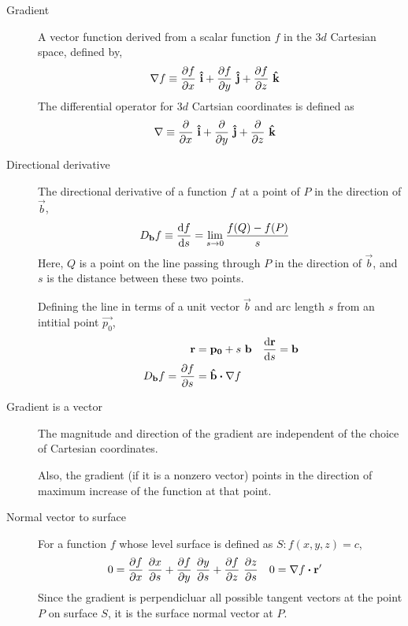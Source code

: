 \begin{description}
    \item[Gradient] A vector function derived from a scalar function $ f $ in the $ 3d $
        Cartesian space, defined by,
        \begin{align}
            \nabla f & \equiv \diffp fx\ \vec{\hat{i}} + \diffp fy\ \vec{\hat{j}}
            + \diffp fz\ \vec{\hat{k}}
        \end{align}
        The differential operator for $ 3d $ Cartsian coordinates is defined as
        \begin{align}
            \nabla & \equiv \diffp {}{x}\ \vec{\hat{i}} + \diffp {}{y}\ \vec{\hat{j}}
            + \diffp {}{z}\ \vec{\hat{k}}
        \end{align}

    \item[Directional derivative] The directional derivative of a function $ f $ at a
        point of $ P $ in the direction of $ \vec{b} $,
        \begin{align}
            D_{\vec{b}}f & \equiv \diff fs =
            \lim_{s \rightarrow 0} \frac{f(Q) - f(P)}{s}
        \end{align}
        Here, $ Q $ is a point on the line passing through $ P $ in the direction of
        $ \vec{b} $, and $ s $ is the distance between these two points. \par
        Defining the line in terms of a unit vector $ \vec{b} $ and arc length $ s $ from
        an intitial point $ \vec{p_0} $,
        \begin{align}
            \vec{r}                  & = \vec{p_0} + s\ \vec{b}       &
            \diff{\vec{r}}{s}        & = \vec{b}                        \\
            D_{\vec{b}}f = \diffp fs & = \vec{\hat{b}} \dotp \nabla f
        \end{align}

    \item[Gradient is a vector] The magnitude and direction of the gradient are
        independent of the choice of Cartesian coordinates. \par
        Also, the gradient (if it is a nonzero vector) points in the direction of maximum
        increase of the function at that point.

    \item[Normal vector to surface] For a function $ f $ whose level surface is defined
        as $ S : f(x, y, z) = c $,
        \begin{align}
            0 & = \diffp fx\ \diffp xs + \diffp fy\ \diffp ys + \diffp fz\ \diffp zs &
            0 & = \nabla f \dotp \vec{r}'
        \end{align}
        Since the gradient is perpendicluar all possible tangent vectors at the point
        $ P $ on surface $ S $, it is the surface normal vector at $ P $.


\end{description}
